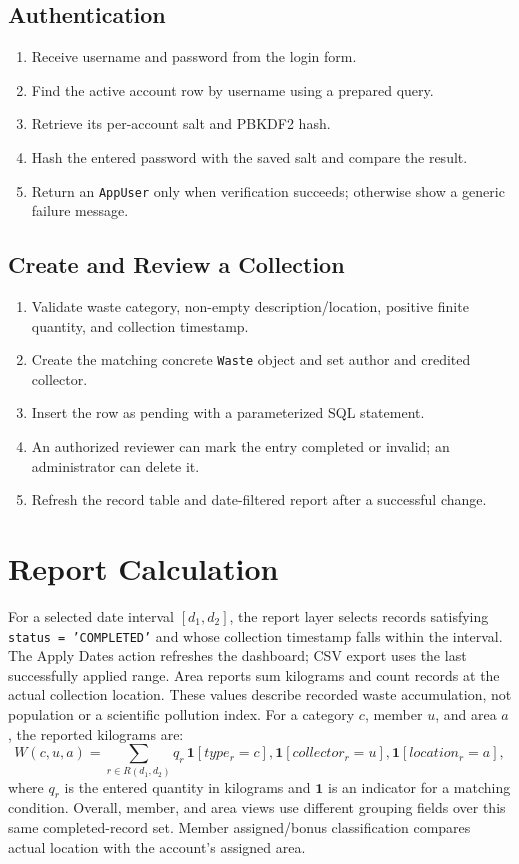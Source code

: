 \documentclass[12pt,a4paper]{report}
\begin{document}
\subsection{Authentication}
\begin{enumerate}[leftmargin=*]
  \item Receive username and password from the login form.
  \item Find the active account row by username using a prepared query.
  \item Retrieve its per-account salt and PBKDF2 hash.
  \item Hash the entered password with the saved salt and compare the result.
  \item Return an \texttt{AppUser} only when verification succeeds; otherwise show a generic failure message.
\end{enumerate}

\subsection{Create and Review a Collection}
\begin{enumerate}[leftmargin=*]
  \item Validate waste category, non-empty description/location, positive finite quantity, and collection timestamp.
  \item Create the matching concrete \texttt{Waste} object and set author and credited collector.
  \item Insert the row as pending with a parameterized SQL statement.
  \item An authorized reviewer can mark the entry completed or invalid; an administrator can delete it.
  \item Refresh the record table and date-filtered report after a successful change.
\end{enumerate}

\section{Report Calculation}
For a selected date interval $[d_1,d_2]$, the report layer selects records satisfying \texttt{status = 'COMPLETED'} and whose collection timestamp falls within the interval. The Apply Dates action refreshes the dashboard; CSV export uses the last successfully applied range. Area reports sum kilograms and count records at the actual collection location. These values describe recorded waste accumulation, not population or a scientific pollution index. For a category $c$, member $u$, and area $a$, the reported kilograms are:
\[
  W(c,u,a)=\sum_{r \in R(d_1,d_2)} q_r\,\mathbf{1}[type_r=c],\mathbf{1}[collector_r=u],\mathbf{1}[location_r=a],
\]
where $q_r$ is the entered quantity in kilograms and $\mathbf{1}$ is an indicator for a matching condition. Overall, member, and area views use different grouping fields over this same completed-record set. Member assigned/bonus classification compares actual location with the account's assigned area.
\end{document}
